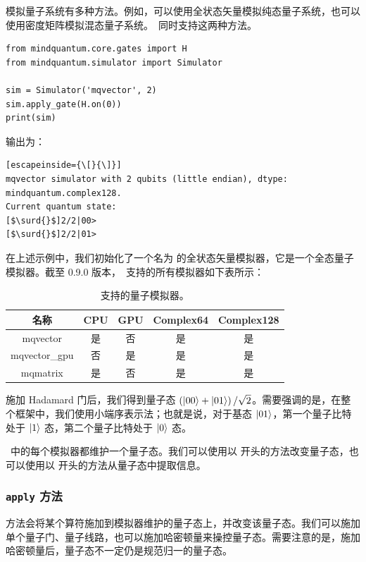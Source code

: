 模拟量子系统有多种方法。例如，可以使用全状态矢量模拟纯态量子系统，也可以使用密度矩阵模拟混态量子系统。\MindQuantum\ 同时支持这两种方法。

\begin{lstlisting}
from mindquantum.core.gates import H
from mindquantum.simulator import Simulator

sim = Simulator('mqvector', 2)
sim.apply_gate(H.on(0))
print(sim)
\end{lstlisting}
输出为：

\begin{lstlisting}[escapeinside={\[}{\]}]
mqvector simulator with 2 qubits (little endian), dtype: mindquantum.complex128.
Current quantum state:
[$\surd{}$]2/2|00>
[$\surd{}$]2/2|01>
\end{lstlisting}

在上述示例中，我们初始化了一个名为  的全状态矢量模拟器，它是一个全态量子模拟器。截至 0.9.0 版本，\MindQuantum\ 支持的所有模拟器如下表所示：
\begin{table}[ht]
    \begin{tabular}{ccccc}
        \toprule
        名称          & CPU & GPU & Complex64 & Complex128 \\
        \midrule
        mqvector      & 是  & 否  & 是        & 是         \\
        mqvector\_gpu & 否  & 是  & 是        & 是         \\
        mqmatrix      & 是  & 否  & 是        & 是         \\
        \bottomrule
    \end{tabular}
    \caption{支持的量子模拟器。}
    \label{tab:simulator_supported}
\end{table}
施加 Hadamard 门后，我们得到量子态 $\left(\ket{00}+\ket{01}\right)/\sqrt{2}$。需要强调的是，在整个框架中，我们使用小端序表示法；也就是说，对于基态 $\ket{01}$，第一个量子比特处于 $\ket{1}$ 态，第二个量子比特处于 $\ket{0}$ 态。

\MindQuantum\ 中的每个模拟器都维护一个量子态。我们可以使用以  开头的方法改变量子态，也可以使用以  开头的方法从量子态中提取信息。

\subsubsection{\texttt{apply} 方法}

 方法会将某个算符施加到模拟器维护的量子态上，并改变该量子态。我们可以施加单个量子门、量子线路，也可以施加哈密顿量来操控量子态。需要注意的是，施加哈密顿量后，量子态不一定仍是规范归一的量子态。

